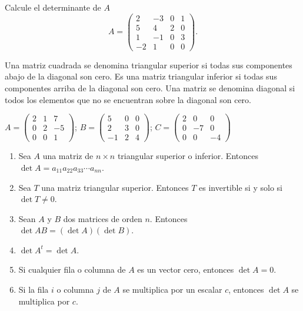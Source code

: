 \begin{ejer}
Calcule el determinante de $A$
$$A = \begin{pmatrix} 2 & -3 & 0 & 1 \\ 5 & 4 & 2 & 0 \\ 1 & -1 & 0 & 3 \\ -2 & 1 & 0 & 0 \end{pmatrix}.$$
\end{ejer}





\begin{rec}
Una matriz cuadrada se denomina triangular superior si todas sus componentes abajo de la diagonal son cero. Es una matriz triangular inferior si todas sus componentes arriba de la diagonal son cero. Una matriz se denomina diagonal si todos los elementos que no se encuentran sobre la diagonal son cero.
\end{rec}

\begin{ejem}

$A = \begin{pmatrix} 2 & 1 & 7 \\ 0 & 2 & -5 \\ 0 & 0 & 1 \end{pmatrix}$; $B = \begin{pmatrix} 5 & 0 & 0 \\ 2 & 3 & 0 \\ -1 & 2 & 4 \end{pmatrix}$; $C = \begin{pmatrix} 2 & 0 & 0 \\ 0 & -7 & 0 \\ 0 & 0 & -4 \end{pmatrix}$
\end{ejem}






\begin{thm}
\begin{enumerate}
    \item Sea $A$ una matriz de $n \times n$ triangular superior o inferior. Entonces $\det A = a_{11}a_{22}a_{33} \cdots a_{nn}$.
    \item Sea $T$ una matriz triangular superior. Entonces $T$ es invertible si y solo si $\det T \not= 0$.
    \item Sean $A$ y $B$ dos matrices de orden $n$. Entonces $\det AB = (\det A) (\det B)$.
    \item $\det A^{t} = \det A$.
    \item Si cualquier fila o columna de $A$ es un vector cero, entonces $\det A = 0$.
    \item Si la fila $i$ o columna $j$ de $A$ se multiplica por un escalar $c$, entonces $\det A$ se multiplica por $c$.
\end{enumerate}
\end{thm}

